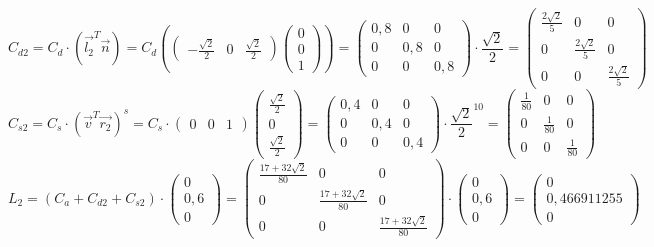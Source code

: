 \documentclass{article}
\begin{document}
\[
C_{d2}=C_d\cdot(\overrightarrow{l_2}^T\overrightarrow{n})=
C_d
(\begin{pmatrix}
-\frac{\sqrt{2}}{2}&0& \frac{\sqrt{2}}{2}
\end{pmatrix}
\begin{pmatrix}
0\\0\\1
\end{pmatrix})=
\begin{pmatrix}
0,8 & 0 & 0\\
0 & 0,8 & 0\\
0 & 0 & 0,8
\end{pmatrix}\cdot \frac{\sqrt{2}}{2}=
\begin{pmatrix}
\frac{2\sqrt{2}}{5} & 0 & 0\\
0 & \frac{2\sqrt{2}}{5} & 0\\
0 & 0 & \frac{2\sqrt{2}}{5}
\end{pmatrix}
\]\[
C_{s2}=C_s\cdot(\overrightarrow{v}^T\overrightarrow{r_2})^s= C_s\cdot
\begin{pmatrix}
0&0&1
\end{pmatrix}
\begin{pmatrix}
\frac{\sqrt{2}}{2}\\ 0\\ \frac{\sqrt{2}}{2}
\end{pmatrix}=
\begin{pmatrix}
0,4 & 0 & 0\\
0 & 0,4 & 0\\
0 & 0 & 0,4
\end{pmatrix}\cdot \frac{\sqrt{2}}{2}^{10}=
\begin{pmatrix}
\frac{1}{80} & 0 & 0\\
0 & \frac{1}{80} & 0\\
0 & 0 & \frac{1}{80}
\end{pmatrix}
\]
\[
L_2=(
C_a+C_{d2}+C_{s2})\cdot
\begin{pmatrix}
0\\0,6\\0
\end{pmatrix}=
\begin{pmatrix}
\frac{17+32\sqrt{2}}{80} & 0 & 0\\
0 &\frac{17+32\sqrt{2}}{80} & 0\\
0 & 0 & \frac{17+32\sqrt{2}}{80}
\end{pmatrix}\cdot
\begin{pmatrix}
0\\0,6\\0
\end{pmatrix}=
\begin{pmatrix}
0\\0,466911255\\0
\end{pmatrix}
\]
\end{document}
